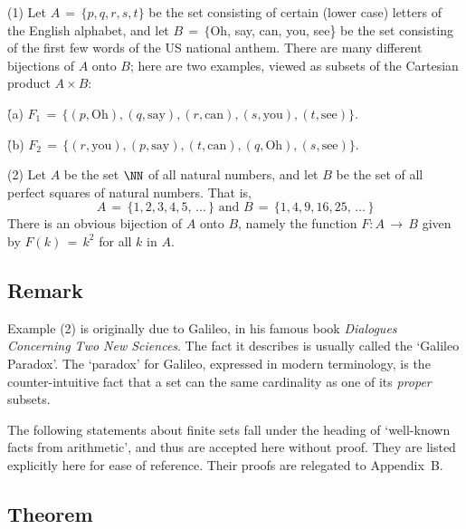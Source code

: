 \hspace*{\parindent}
    (1) Let $A \,=\, \{p,q,r,s,t\}$ be the set consisting of certain (lower case) letters of the English alphabet,
    and let $B \,=\, \{$\mbox{Oh}, \mbox{say}, \mbox{can}, \mbox{you}, \mbox{see}\} be the set consisting of the first few words of the US national anthem.
    There are many different bijections of $A$ onto $B$; here are two examples, viewed as subsets of the Cartesian product $A{\times}B$:

       \h (a) $F_{1} \,=\, \{(p,\mbox{Oh}), (q,\mbox{say}), (r,\mbox{can}), (s,\mbox{you}), (t,\mbox{see})\}$.

       \h (b) $F_{2} \,=\, \{(r,\mbox{you}), (p,\mbox{say}), (t,\mbox{can}), (q,\mbox{Oh}), (s,\mbox{see})\}$.

\V

        (2) Let $A$ be the set ${\NN}$ of all natural numbers,
    and let $B$ be the set of all perfect squares of natural numbers.
    That is,
        \begin{displaymath}
        A \,=\, \{1,2,3,4,5,\,{\ldots}\,\} \mbox{ and } B \,=\, \{1,4,9,16,25,\,{\ldots}\,\}
        \end{displaymath}
    There is an obvious bijection of $A$ onto $B$, namely the function $F:A \,{\rightarrow}\, B$ given by $F(k) \,=\, k^{2}$ for all $k$ in $A$.

\V
            \subsection{\small{\bf Remark}}
            \label{RemrkA15.25}
        Example (2) is originally due to Galileo, in his famous book {\em Dialogues Concerning Two New Sciences}.
    The fact it describes is usually called the `Galileo Paradox'. The `paradox' for Galileo, 
    expressed in modern terminology, is the counter-intuitive fact that a set can the same cardinality as one of its {\em proper} subsets.


\V
\V

        The following statements about finite sets fall under the heading of `well-known facts from arithmetic', and thus are accepted here without proof.
    They are listed explicitly here for ease of reference. Their proofs are relegated to Appendix~B.

\V


            \subsection{\small{\bf Theorem}}
            \label{ThmA15.30}

